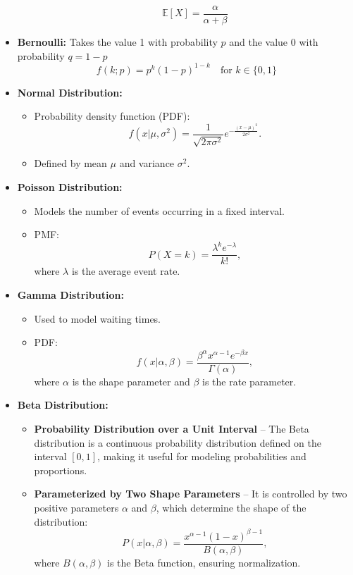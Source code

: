 \documentclass[12pt,a4paper]{article}
\begin{document}
\begin{itemize}
\begin{itemize}
  \[
  \mathbb{E}[X] = \frac{\alpha}{\alpha + \beta}
  \]
\end{itemize}
\item \textbf{Bernoulli: } Takes the value 1 with probability 
${\displaystyle p}$ and the value 0 with probability 
${\displaystyle q=1-p}$
\[\displaystyle f(k;p)=p^{k}(1-p)^{1-k}\quad {\text{for }}k\in \{0,1\}\]
    \item \textbf{Normal Distribution:}
    \begin{itemize}
        \item Probability density function (PDF):
        \[ f(x | \mu, \sigma^2) = \frac{1}{\sqrt{2\pi\sigma^2}} e^{-\frac{(x - \mu)^2}{2\sigma^2}}. \]
        \item Defined by mean $\mu$ and variance $\sigma^2$.
    \end{itemize}
    \item \textbf{Poisson Distribution:}
    \begin{itemize}
        \item Models the number of events occurring in a fixed interval.
        \item PMF:
        \[ P(X = k) = \frac{\lambda^k e^{-\lambda}}{k!}, \]
        where $\lambda$ is the average event rate.
    \end{itemize}
    \item \textbf{Gamma Distribution:}
    \begin{itemize}
        \item Used to model waiting times.
        \item PDF:
        \[ f(x | \alpha, \beta) = \frac{\beta^\alpha x^{\alpha-1} e^{-\beta x}}{\Gamma(\alpha)}, \]
        where $\alpha$ is the shape parameter and $\beta$ is the rate parameter.
    \end{itemize}
    \item \textbf{Beta Distribution:}
    \begin{itemize}
    \item \textbf{Probability Distribution over a Unit Interval} – The Beta distribution is a continuous probability distribution defined on the interval \( [0,1] \), making it useful for modeling probabilities and proportions.
    
    \item \textbf{Parameterized by Two Shape Parameters} – It is controlled by two positive parameters \( \alpha \) and \( \beta \), which determine the shape of the distribution:
    \[
    P(x | \alpha, \beta) = \frac{x^{\alpha-1} (1 - x)^{\beta-1}}{B(\alpha, \beta)},
    \]
    where \( B(\alpha, \beta) \) is the Beta function, ensuring normalization.
    

\end{itemize}
\end{itemize}
\end{document}
